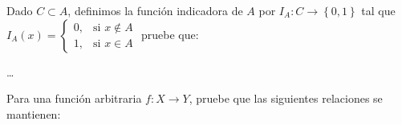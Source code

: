 \documentclass{testfcuni}
\begin{document}
\begin{questions}

  \question

  Dado $C\subset A$, definimos la función indicadora de $A$ por
  $I_{A}\colon C\rightarrow\left\{0,1\right\}$ tal que
  \begin{math}
    I_{A}\left(x\right)=
    \begin{cases}
      0, & \text{si }x\notin A \\
      1, & \text{si }x\in A
    \end{cases}
  \end{math}
  \linebreak pruebe que:


  \begin{solution}
    \ldots
  \end{solution}

  \question

  Para una función arbitraria $f\colon X\rightarrow Y$, pruebe que
  las siguientes relaciones se mantienen:

\end{questions}
\end{document}
